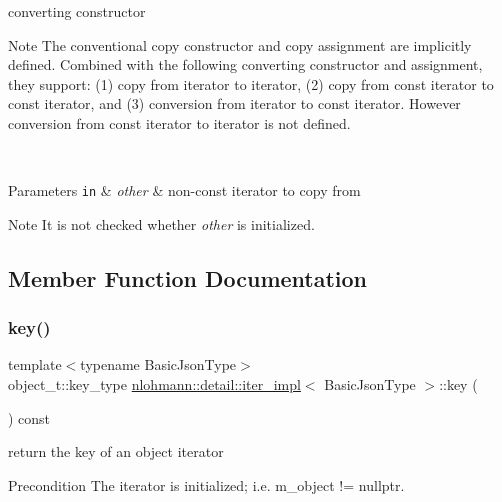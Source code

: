 converting constructor 

\begin{DoxyNote}{Note}
The conventional copy constructor and copy assignment are implicitly defined. Combined with the following converting constructor and assignment, they support\+: (1) copy from iterator to iterator, (2) copy from const iterator to const iterator, and (3) conversion from iterator to const iterator. However conversion from const iterator to iterator is not defined.
\end{DoxyNote}
~\newline

\begin{DoxyParams}[1]{Parameters}
\mbox{\tt in}  & {\em other} & non-\/const iterator to copy from \\
\hline
\end{DoxyParams}
\begin{DoxyNote}{Note}
It is not checked whether {\itshape other} is initialized. 
\end{DoxyNote}


\subsection{Member Function Documentation}
\mbox{\label{classnlohmann_1_1detail_1_1iter__impl_a3a541a223320f6635f2f188ba54f8818}} 
\subsubsection{\texorpdfstring{key()}{key()}}
{\footnotesize\ttfamily template$<$typename Basic\+Json\+Type$>$ \\
object\+\_\+t\+::key\+\_\+type \mbox{\hyperlink{classnlohmann_1_1detail_1_1iter__impl}{nlohmann\+::detail\+::iter\+\_\+impl}}$<$ Basic\+Json\+Type $>$\+::key (\begin{DoxyParamCaption}{ }\end{DoxyParamCaption}) const\hspace{0.3cm}{\ttfamily [inline]}}



return the key of an object iterator 

\begin{DoxyPrecond}{Precondition}
The iterator is initialized; i.\+e. {\ttfamily m\+\_\+object != nullptr}. 
\end{DoxyPrecond}
\mbox{\label{classnlohmann_1_1detail_1_1iter__impl_aeab0e2b5da70b3bdebecd5b1a6ee66a6}} 

